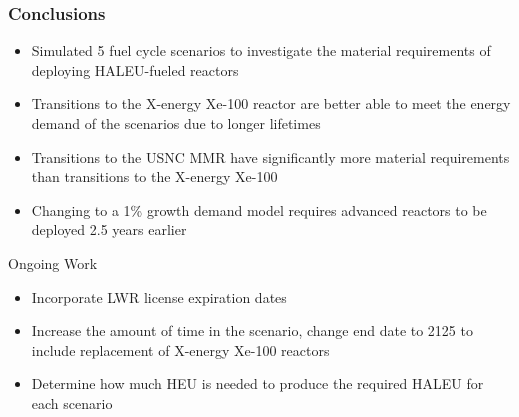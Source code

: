 \begin{frame}
    \frametitle{Conclusions}
    \begin{itemize}
        \item Simulated 5 fuel cycle scenarios to investigate the material 
              requirements of deploying \gls{HALEU}-fueled reactors
        \item Transitions to the X-energy Xe-100 reactor are better able to meet 
              the energy demand of the scenarios due to longer lifetimes
        \item Transitions to the \gls{USNC} \gls{MMR}
              have significantly more material requirements than transitions to 
              the X-energy Xe-100
        \item Changing to a 1\% growth demand model requires 
              advanced reactors to be deployed 2.5 years earlier
    \end{itemize}
    \begin{block}{Ongoing Work}
        \begin{itemize}
            \item Incorporate \gls{LWR} license expiration dates
            \item Increase the amount of time in the scenario, change end date to 2125 to include 
                  replacement of X-energy Xe-100 reactors
            \item Determine how much \gls{HEU} is needed to produce the required \gls{HALEU} for 
                  each scenario
        \end{itemize}
    \end{block}
\end{frame}
